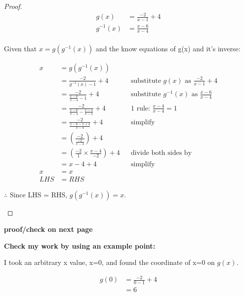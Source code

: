 \documentclass[12pt]{book}
\begin{document}
\begin{enumerate}
\begin{proof}
    \begin{align*}
        g(x) &= \frac{-2}{x-1}+4\\
        g^{-1}(x) &= \frac{x-6}{x-4} \\
    \end{align*}
    \vspace{-5em}

    \begin{center}
        Given that $x = g(g^{-1}(x))$ and the know equations of g(x) and it's inverse:
    \end{center}
    \vspace{-2em}

    \begin{align*}
        x &= g(g^{-1}(x)) \\
        &= \frac{-2}{g^{-1}(x)-1}+4 && \text{substitute $g(x)$ as $\frac{-2}{x-1}+4$} \\
        &= \frac{-2}{\frac{x-6}{x-4}-1}+4 && \text{substitute $g^{-1}(x)$ as $\frac{x-6}{x-4}$} \\
        &= \frac{-2}{\frac{x-6}{x-4}-\frac{x-4}{x-4}}+4 && \text{1 rule: } \frac{x-4}{x-4} = 1 \\
        &= \frac{-2}{\frac{x-6-x+4}{x-4}}+4 && \text{simplify} \\
        &= \left( \frac{-2}{\frac{-2}{x-4}} \right) +4 \\
        &= \left( \frac{-2}{1} \times \frac{x-4}{-2} \right) +4 && \text{divide both sides by } \\
        &= x-4+4 && \text{simplify} \\
        x &= x \\
        LHS &= RHS
    \end{align*}

    \begin{center}
        $\therefore$ Since LHS = RHS, $g(g^{-1}(x)) = x$. \qedhere
    \end{center}
\end{proof}
\vspace{2em}
\begin{center}
    \textbf{proof/check on next page}
\end{center}
\newpage

\textbf{Check my work by using an example point:}
\vspace{1em}

I took an arbitrary x value, x=0, and found the coordinate of x=0 on $g(x)$.

\begin{align*}
    g(0) &= \frac{-2}{0-1}+4 \\
    &= 6
\end{align*}


\end{enumerate}
\end{document}

